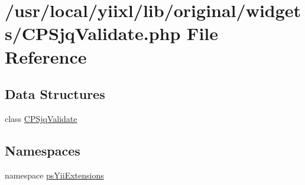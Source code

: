 \hypertarget{CPSjqValidate_8php}{
\section{/usr/local/yiixl/lib/original/widgets/CPSjqValidate.php File Reference}
\label{CPSjqValidate_8php}
}
\subsection*{Data Structures}
\begin{DoxyCompactItemize}
\item 
class \hyperlink{classCPSjqValidate}{CPSjqValidate}
\end{DoxyCompactItemize}
\subsection*{Namespaces}
\begin{DoxyCompactItemize}
\item 
namespace \hyperlink{namespacepsYiiExtensions}{psYiiExtensions}
\end{DoxyCompactItemize}
